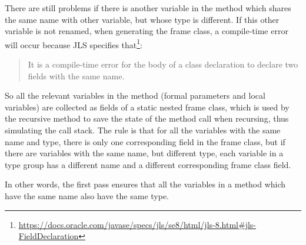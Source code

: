 There are still problems if there is another variable in the method which shares the same name with other variable, but
whose type is different. If this other variable is not renamed, when generating the frame class, a compile-time error
will occur because JLS specifies that\footnote{\url{https://docs.oracle.com/javase/specs/jls/se8/html/jls-8.html#jls-FieldDeclaration}}:
\begin{quote}
    It is a compile-time error for the body of a class declaration to declare two fields with the same name.
\end{quote}

So all the relevant variables in the method (formal parameters and local variables) are collected as fields of a
static nested frame class, which is used by the recursive method to save the state of the method call when
recursing, thus simulating the call stack. The rule is that for all the variables with the same name and type, there
is only one corresponding field in the frame class, but if there are variables with the same name, but different
type, each variable in a type group has a different name and a different corresponding frame class field.

In other words, the first pass ensures that all the variables in a method which have the same name also have the same
type.

